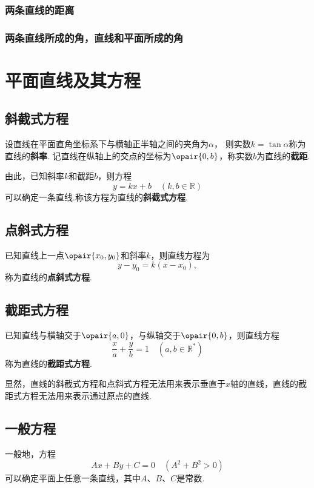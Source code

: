 \subsubsection{两条直线的距离}

\subsubsection{两条直线所成的角，直线和平面所成的角}

\section{平面直线及其方程}
\subsection{斜截式方程}
设直线在平面直角坐标系下与横轴正半轴之间的夹角为\(\alpha\)，
则实数\(k = \tan \alpha\)称为直线的\textbf{斜率}.
记直线在纵轴上的交点的坐标为\(\opair{0,b}\)，称实数\(b\)为直线的\textbf{截距}.

由此，已知斜率\(k\)和截距\(b\)，则方程\[
y = k x + b \quad(k,b \in \mathbb{R})
\]可以确定一条直线.称该方程为直线的\textbf{斜截式方程}.

\subsection{点斜式方程}
已知直线上一点\(\opair{x_0,y_0}\)和斜率\(k\)，则直线方程为\[
y-y_0 = k(x-x_0),
\]称为直线的\textbf{点斜式方程}.

\subsection{截距式方程}
已知直线与横轴交于\(\opair{a,0}\)，与纵轴交于\(\opair{0,b}\)，则直线方程\[
\frac{x}{a}+\frac{y}{b}=1 \quad(a,b\in\mathbb{R}^*)
\]称为直线的\textbf{截距式方程}.

显然，直线的斜截式方程和点斜式方程无法用来表示垂直于\(x\)轴的直线，直线的截距式方程无法用来表示通过原点的直线.

\subsection{一般方程}
一般地，方程\[
A x + B y + C = 0 \quad(A^2+B^2>0)
\]可以确定平面上任意一条直线，其中\(A\)、\(B\)、\(C\)是常数.

